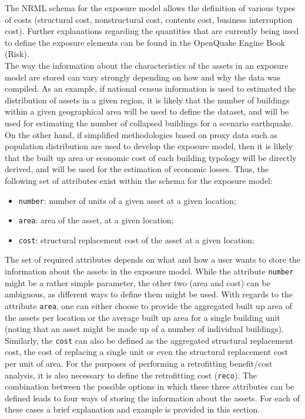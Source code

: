 The NRML schema for the exposure model allows the definition of various types of costs (structural cost, nonstructural cost, contents cost, business interruption cost). Further explanations regarding the quantities that are currently being used to define the exposure elements can be found in the OpenQuake Engine Book (Risk).
\\
The way the information about the characteristics of the \glspl{asset} in an \gls{exposure model} are stored can vary strongly depending on how and why the data was compiled. As an example, if national census information is used to estimated the distribution of assets in a given region, it is likely that the number of buildings within a given geographical area will be used to define the dataset, and will be used for estimating the number of collapsed buildings for a scenario earthquake. On the other hand, if simplified methodologies based on proxy data such as population distribution are used to develop the exposure model, then it is likely that the built up area or economic cost of each building typology will be directly derived, and will be used for the estimation of economic losses. Thus, the following set of attributes exist within the schema for the exposure model:

\begin{itemize}
\item  \Verb+number+: number of units of a given \gls{asset} at a given location;
\item  \Verb+area+: area of the \gls{asset}, at a given location;
\item  \Verb+cost+: structural replacement cost of the \gls{asset} at a given location;
\end{itemize}

The set of required attributes depends on what and how a user wants to store the information about the assets in the exposure model. While the attribute \Verb+number+ might be a rather simple parameter, the other two (area and cost) can be ambiguous, as different ways to define them might be used. With regards to the attribute \Verb+area+, one can either choose to provide the aggregated built up area of the \glspl{asset} per location or the average built up area for a single building unit (noting that an \gls{asset} might be made up of a number of individual buildings). Similarly, the \Verb+cost+ can also be defined as the aggregated structural replacement cost, the cost of replacing a single unit or even the structural replacement cost per unit of area. For the purposes of performing a retrofitting benefit/cost analysis, it is also necessary to define the retrofitting cost (\Verb+reco+). The combination between the possible options in which these three attributes can be defined leads to four ways of storing the information about the assets. For each of these cases a brief explanation and example is provided in this section.

